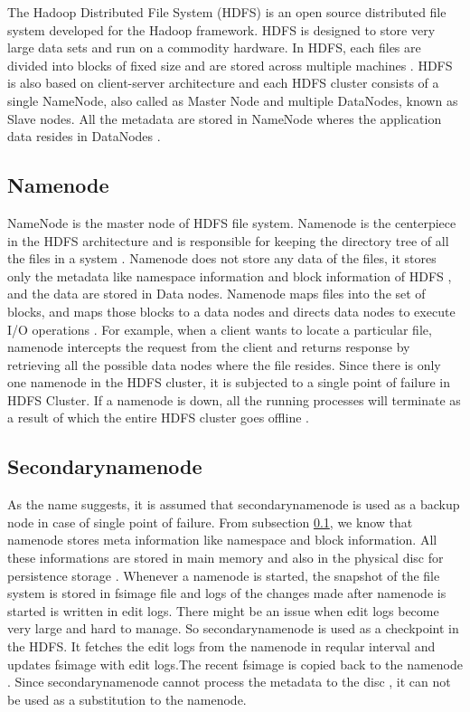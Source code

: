 \documentclass[11pt,a4paper,bibtotoc,idxtotoc,headsepline,footsepline,footexclude,BCOR12mm,DIV13]{scrbook}
\begin{document}
The Hadoop Distributed File System (HDFS) is an open source distributed file system developed for the Hadoop framework. HDFS is designed to store very large data sets and run on a commodity hardware. In HDFS, each files are divided into blocks of fixed size and are stored across multiple machines \cite{HDFS:architecture}. HDFS is also based on client-server architecture and each HDFS cluster consists of a single NameNode, also called as Master Node and multiple DataNodes, known as Slave nodes. All the metadata are stored in NameNode wheres the application data resides in DataNodes \cite{hadoop:architecture}.

\subsection{Namenode}
\label{NameNode}
NameNode is the master node of HDFS file system. Namenode is the centerpiece in the HDFS architecture and is responsible for keeping the directory tree of all the files in a system \cite{HDFS:namenodeanddatanode}. Namenode does not store any data of the files, it stores 
only the metadata like namespace information and block information of HDFS \cite{HDFS:namenodeanddatanode}, and the data are stored in Data nodes. Namenode maps files into the set of blocks, and maps those blocks to a data nodes and directs data nodes to execute I/O operations \cite{HDFS:namenodeanddatanode}. For example, when a client wants to locate a particular file, namenode intercepts the request from the client and returns response by retrieving all the possible data nodes where the file resides. Since there is only one namenode in the HDFS cluster, it is subjected to a single point of failure in HDFS Cluster. If a namenode is down, all the running processes will terminate as a result of which the entire HDFS cluster goes offline \cite{HDFS:namenodeanddatanode}.  

\subsection{Secondarynamenode}
\label{SecondaryNameNode}
As the name suggests, it is assumed that secondarynamenode is used as a backup node in case of single point of failure. From subsection \ref{NameNode}, we know that namenode stores meta information like namespace and block information. All these informations are stored in main memory and also in the physical disc for persistence storage \cite{HDFS:secondarynamenode}. Whenever a namenode is started, the snapshot of the file system is stored in fsimage file and logs of the changes made after namenode is started is written in edit logs. There might be an issue when edit logs become very large and hard to manage. So secondarynamenode is used as a checkpoint in the HDFS. It fetches the edit logs from the namenode in reqular interval and updates fsimage with edit logs.The recent fsimage is copied back to the namenode \cite{HDFS:secondarynamenode}. Since secondarynamenode cannot process the metadata to the disc \cite{HDFS:architecture}, it can not be used as a substitution to the namenode.
\end{document}
